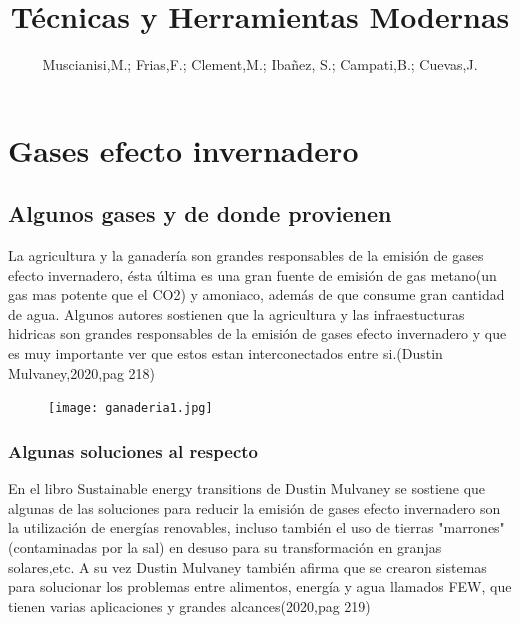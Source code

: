 \documentclass[runningheads]{llncs}
\begin{document}
%
\title{Técnicas y Herramientas Modernas}
%
%
\author{Muscianisi,M.;  Frias,F.;  Clement,M.;  Ibañez, S.;  Campati,B.;  Cuevas,J.}
%

%


%
\maketitle              %
%

%
%
\section{Gases efecto invernadero}
\subsection{Algunos gases y de donde provienen}
La agricultura y la ganadería son grandes responsables de la emisión de gases efecto invernadero, ésta última es una gran fuente de emisión de gas metano(un gas mas potente que el CO2) y amoniaco, además de que consume gran cantidad de agua.
Algunos autores sostienen que la agricultura y las infraestucturas hidricas son grandes responsables de la emisión de gases efecto invernadero y que es muy importante ver que estos estan interconectados entre si.(Dustin Mulvaney,2020,pag 218)
\begin{figure}
\texttt{[image: ganaderia1.jpg]}
\end{figure}









\subsubsection{Algunas soluciones al respecto}  En el libro Sustainable energy transitions de Dustin Mulvaney se sostiene que algunas de las soluciones para reducir la emisión de gases efecto invernadero son la utilización de energías renovables, incluso también el uso de tierras "marrones" (contaminadas por la sal) en desuso para su transformación en granjas solares,etc.
A su vez Dustin Mulvaney también afirma que se crearon sistemas para solucionar los problemas entre alimentos, energía y agua llamados FEW, que tienen varias aplicaciones y grandes alcances(2020,pag 219)
 
\end{document}
